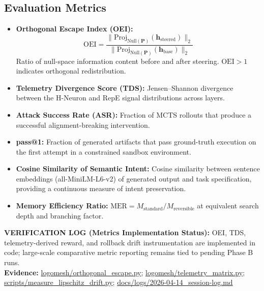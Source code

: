 \documentclass[10pt]{article}
\newcommand{\verifybox}[3]{%
\vspace{0.6em}
\noindent\colorbox{yellow!20}{%
\parbox{\dimexpr\linewidth-2\fboxsep\relax}{%
\textbf{VERIFICATION LOG (#1):} #2\\
\textbf{Evidence:} #3
}}%
\vspace{0.6em}
}
\begin{document}
\subsection{Evaluation Metrics}

\begin{itemize}[leftmargin=*]
    \item \textbf{Orthogonal Escape Index (OEI):}
    \begin{equation}
    \text{OEI} = \frac{\|\text{Proj}_{\text{Null}(\mathbf{P})}(\mathbf{h}_{\text{steered}})\|_2}{\|\text{Proj}_{\text{Null}(\mathbf{P})}(\mathbf{h}_{\text{base}})\|_2}
    \label{eq:oei}
    \end{equation}
    Ratio of null-space information content before and after steering. $\text{OEI} > 1$ indicates orthogonal redistribution.


    \item \textbf{Telemetry Divergence Score (TDS):} Jensen--Shannon divergence between the H-Neuron and RepE signal distributions across layers.

    \item \textbf{Attack Success Rate (ASR):} Fraction of MCTS rollouts that produce a successful alignment-breaking intervention.

    \item \textbf{pass@1:} Fraction of generated artifacts that pass ground-truth execution on the first attempt in a constrained sandbox environment.

    \item \textbf{Cosine Similarity of Semantic Intent:} Cosine similarity between sentence embeddings (all-MiniLM-L6-v2) of generated output and task specification, providing a continuous measure of intent preservation.

    \item \textbf{Memory Efficiency Ratio:} $\text{MER} = M_{\text{standard}} / M_{\text{reversible}}$ at equivalent search depth and branching factor.
\end{itemize}

\verifybox
{Metrics Implementation Status}
{OEI, TDS, telemetry-derived reward, and rollback drift instrumentation are implemented in code; large-scale comparative metric reporting remains tied to pending Phase B runs.}
{\url{logomesh/orthogonal_escape.py}; \url{logomesh/telemetry_matrix.py}; \url{scripts/measure_lipschitz_drift.py}; \url{docs/logs/2026-04-14_session-log.md}}
\end{document}
